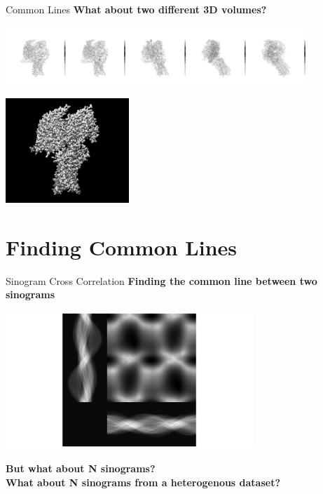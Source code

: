 \documentclass[t, 11pt, xcolor=dvipsnames]{beamer}
\begin{document}
\begin{frame}[fragile]{Common Lines}
  \centering\textbf{What about two different 3D volumes?}
 \begin{center}\includegraphics[width=0.85\textwidth]{images/common_line.png}
    \end{center}
 \begin{center}\includegraphics[width=0.35\textwidth]{images/3D_model.png}
    \end{center}
\end{frame}

\section{Finding Common Lines}

\begin{frame}[fragile]{Sinogram Cross Correlation}
  \centering\textbf{Finding the common line between two sinograms}
  \begin{center}\includegraphics[width=0.7\textwidth]{images/2sin_comp.png}
    \end{center}
  \pause
  \centering\textbf{But what about N sinograms?} \\
  \pause
  \centering\textbf{What about N sinograms from a heterogenous dataset?}

\end{frame}
\end{document}
